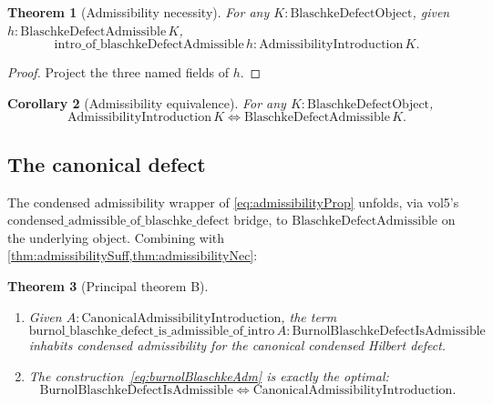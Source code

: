 \documentclass[12pt]{article}
\newtheorem{theorem}{Theorem}[section]
\newtheorem{corollary}[theorem]{Corollary}
\theoremstyle{definition}
\theoremstyle{remark}
\begin{document}
\begin{theorem}[Admissibility necessity]\label{thm:admissibilityNec}
For any $K : \mathrm{BlaschkeDefectObject}$, given $h : \mathrm{BlaschkeDefectAdmissible}\,K$,
\begin{equation}\label{eq:admNec}
  \mathrm{intro\_of\_blaschkeDefectAdmissible}\,h
  : \mathrm{AdmissibilityIntroduction}\,K.
\end{equation}
\end{theorem}

\begin{proof}
Project the three named fields of $h$.
\end{proof}

\begin{corollary}[Admissibility equivalence]\label{cor:admissibilityEquiv}
For any $K : \mathrm{BlaschkeDefectObject}$,
\begin{equation}\label{eq:admEquiv}
  \mathrm{AdmissibilityIntroduction}\,K \iff \mathrm{BlaschkeDefectAdmissible}\,K.
\end{equation}
\end{corollary}

\subsection{The canonical defect}\label{subsec:admCanonical}

The condensed admissibility wrapper of \eqref{eq:admissibilityProp} unfolds, via vol5's $\mathrm{condensed\_admissible\_of\_blaschke\_defect}$ bridge, to $\mathrm{BlaschkeDefectAdmissible}$ on the underlying object. Combining with \cref{thm:admissibilitySuff,thm:admissibilityNec}:

\begin{theorem}[Principal theorem B]\label{thm:principalB}
\
\begin{enumerate}
  \item Given $A : \mathrm{CanonicalAdmissibilityIntroduction}$, the term
  \begin{equation}\label{eq:burnolBlaschkeAdm}
    \mathrm{burnol\_blaschke\_defect\_is\_admissible\_of\_intro}\,A
    : \mathrm{BurnolBlaschkeDefectIsAdmissible}
  \end{equation}
  inhabits condensed admissibility for the canonical condensed Hilbert defect.
  \item The construction~\eqref{eq:burnolBlaschkeAdm} is exactly the optimal:
  \begin{equation}\label{eq:burnolBlaschkeAdmIff}
    \mathrm{BurnolBlaschkeDefectIsAdmissible} \iff \mathrm{CanonicalAdmissibilityIntroduction}.
  \end{equation}
\end{enumerate}
\end{theorem}
\end{document}
